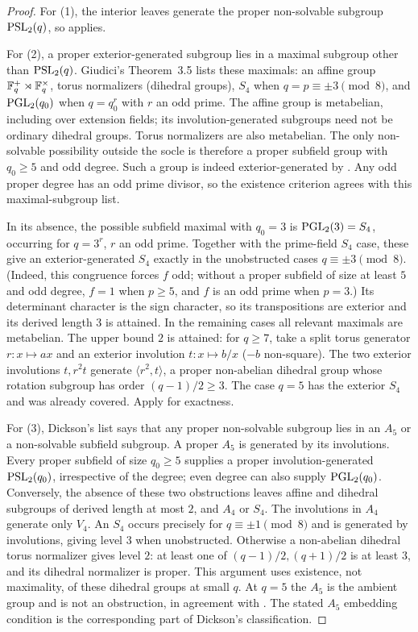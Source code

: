 \begin{proof}
For (1), the interior leaves generate the proper non-solvable subgroup
$\operatorname{PSL}_2(q)$, so  applies.

For (2), a proper exterior-generated subgroup lies in a maximal subgroup
other than $\operatorname{PSL}_2(q)$. Giudici's Theorem~3.5 lists these maximals: an affine
group $\mathbb{F}_q^+\rtimes\mathbb{F}_q^\times$, torus normalizers (dihedral groups), $S_4$
when $q=p\equiv\pm3\pmod8$, and $\operatorname{PGL}_2(q_0)$ when $q=q_0^r$ with $r$ an odd
prime. The affine group is metabelian, including over extension fields;
its involution-generated subgroups need not be ordinary dihedral groups.
Torus normalizers are also metabelian. The only non-solvable possibility
outside the socle is therefore a proper subfield group with $q_0\ge5$ and
odd degree. Such a group is indeed exterior-generated by
. Any odd proper degree has an odd prime divisor,
so the existence criterion agrees with this maximal-subgroup list.

In its absence, the possible subfield maximal with $q_0=3$ is
$\operatorname{PGL}_2(3)=S_4$, occurring for $q=3^r$, $r$ an odd prime. Together with the
prime-field $S_4$ case, these give an exterior-generated $S_4$ exactly in
the unobstructed cases $q\equiv\pm3\pmod8$.
(Indeed, this congruence forces $f$ odd; without a proper subfield of size
at least $5$ and odd degree, $f=1$ when $p\ge5$, and $f$ is an odd prime
when $p=3$.) Its determinant character is
the sign character, so its transpositions are exterior and its derived
length $3$ is attained. In the remaining cases all relevant maximals are
metabelian. The upper bound $2$ is attained: for $q\ge7$, take a split
torus generator $r:x\mapsto ax$ and an exterior involution $t:x\mapsto b/x$
($-b$ non-square). The two exterior involutions $t,r^2t$ generate
$\langle r^2,t\rangle$, a proper non-abelian dihedral group whose rotation
subgroup has order $(q-1)/2\ge3$. The case $q=5$ has the exterior $S_4$ and
was already covered. Apply  for exactness.

For (3), Dickson's list says that any proper non-solvable subgroup lies in
an $A_5$ or a non-solvable subfield subgroup. A proper $A_5$ is generated
by its involutions. Every proper subfield of size $q_0\ge5$ supplies a
proper involution-generated $\operatorname{PSL}_2(q_0)$, irrespective of the degree;
even degree can also supply $\operatorname{PGL}_2(q_0)$. Conversely, the absence of these
two obstructions leaves affine and dihedral subgroups of derived length
at most $2$, and $A_4$ or $S_4$. The involutions in $A_4$ generate only
$V_4$. An $S_4$ occurs precisely for $q\equiv\pm1\pmod8$ and is generated
by involutions, giving level $3$ when unobstructed. Otherwise a
non-abelian dihedral torus normalizer gives level $2$: at least one of
$(q-1)/2,(q+1)/2$ is at least $3$, and its dihedral normalizer is proper.
This argument uses existence, not maximality, of these dihedral groups
at small $q$. At $q=5$ the $A_5$ is the ambient group and is not an
obstruction, in agreement with . The stated $A_5$ embedding
condition is the corresponding part of Dickson's classification.
\end{proof}

